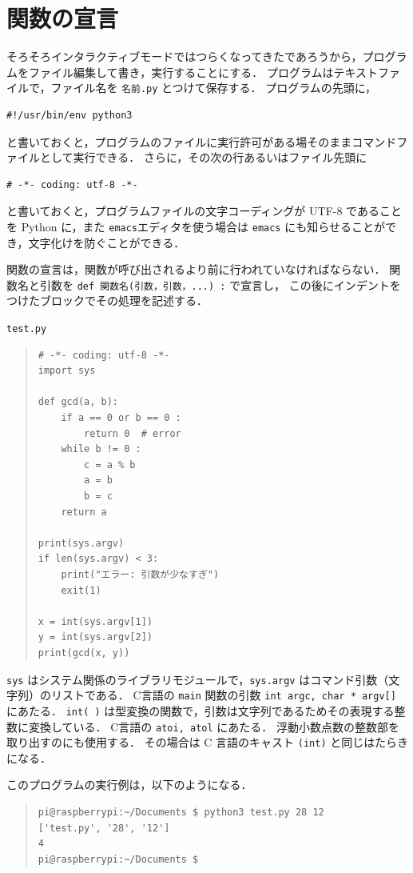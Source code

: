 \documentclass[11pt,a4,epsf]{article}
\begin{document}
\section{関数の宣言}

そろそろインタラクティブモードではつらくなってきたであろうから，プログラムをファイル編集して書き，実行することにする．
プログラムはテキストファイルで，ファイル名を \verb+名前.py+ とつけて保存する．
プログラムの先頭に，
\begin{verbatim}
#!/usr/bin/env python3
\end{verbatim}
と書いておくと，プログラムのファイルに実行許可がある場そのままコマンドファイルとして実行できる．
さらに，その次の行あるいはファイル先頭に
\begin{verbatim}
# -*- coding: utf-8 -*-
\end{verbatim}
と書いておくと，プログラムファイルの文字コーディングが UTF-8 であることを Python に，また \verb+emacs+エディタを使う場合は \verb+emacs+ にも知らせることができ，文字化けを防ぐことができる．

関数の宣言は，関数が呼び出されるより前に行われていなければならない．
関数名と引数を \verb+def 関数名(引数，引数，...) :+ で宣言し，
この後にインデントをつけたブロックでその処理を記述する．
\begin{itembox}[l]{\tt test.py}
\begin{quote}
\small
\begin{verbatim}
# -*- coding: utf-8 -*-
import sys

def gcd(a, b):
    if a == 0 or b == 0 :
        return 0  # error
    while b != 0 :
        c = a % b
        a = b
        b = c
    return a

print(sys.argv)
if len(sys.argv) < 3:
    print("エラー: 引数が少なすぎ")
    exit(1) 

x = int(sys.argv[1])
y = int(sys.argv[2])
print(gcd(x, y))
\end{verbatim}
\end{quote}
\end{itembox}
\verb+sys+ はシステム関係のライブラリモジュールで，\verb+sys.argv+ はコマンド引数（文字列）のリストである．
C言語の \verb+main+ 関数の引数 \verb+int argc, char * argv[]+ にあたる．
\verb+int( )+ は型変換の関数で，引数は文字列であるためその表現する整数に変換している．
C言語の \verb+atoi, atol+ にあたる．
浮動小数点数の整数部を取り出すのにも使用する．
その場合は C 言語のキャスト \verb+(int)+ と同じはたらきになる．

このプログラムの実行例は，以下のようになる．
\begin{quote}
\small
\begin{verbatim}
pi@raspberrypi:~/Documents $ python3 test.py 28 12
['test.py', '28', '12']
4
pi@raspberrypi:~/Documents $
\end{verbatim}
\end{quote}
\end{document}
